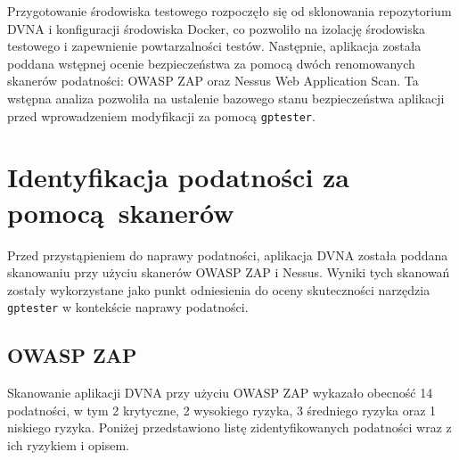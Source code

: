 Przygotowanie środowiska testowego rozpoczęło się od sklonowania repozytorium DVNA i konfiguracji środowiska Docker, co pozwoliło na izolację środowiska testowego i zapewnienie powtarzalności testów. Następnie, aplikacja została poddana wstępnej ocenie bezpieczeństwa za pomocą dwóch renomowanych skanerów podatności: OWASP ZAP oraz Nessus Web Application Scan. Ta wstępna analiza pozwoliła na ustalenie bazowego stanu bezpieczeństwa aplikacji przed wprowadzeniem modyfikacji za pomocą \texttt{gptester}.
\newpage
\section{Identyfikacja podatności za pomocą skanerów}
Przed przystąpieniem do naprawy podatności, aplikacja DVNA została poddana skanowaniu przy użyciu skanerów OWASP ZAP i Nessus. Wyniki tych skanowań zostały wykorzystane jako punkt odniesienia do oceny skuteczności narzędzia \texttt{gptester} w kontekście naprawy podatności.


\subsection{OWASP ZAP}
\label{subsec:owasp_zap}
Skanowanie aplikacji DVNA przy użyciu OWASP ZAP wykazało obecność 14 podatności, w tym 2 krytyczne, 2 wysokiego ryzyka, 3 średniego ryzyka oraz 1 niskiego ryzyka. Poniżej przedstawiono listę zidentyfikowanych podatności wraz z ich ryzykiem i opisem.

